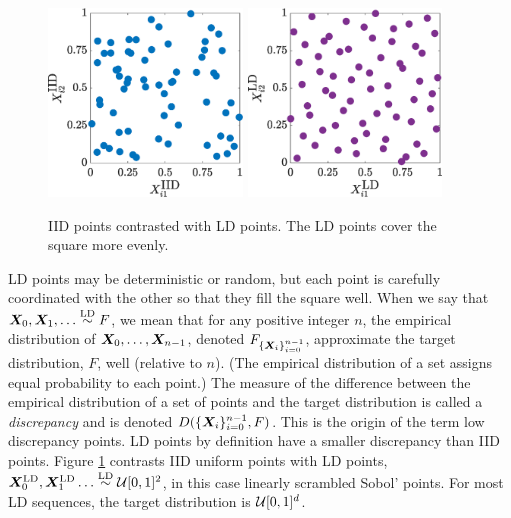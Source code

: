 \documentclass[graybox,footinfo]{svmult}
\newcommand{\LD}{\textup{LD}}
\newcommand{\LDsim}{\overset{\LD}{\sim}}
\begin{document}
\begin{figure}
	\includegraphics[height=5cm]{ProgramsImages/IIDPoints.eps} \qquad
	\includegraphics[height=5cm]{ProgramsImages/SSobolPoints.eps}
	\caption{IID points contrasted with LD points.  The LD points cover the square more evenly.} \label{fig:comparePts}
\end{figure}

LD points may be deterministic or random, but each point is carefully coordinated with the other so that they fill the square well.  When we say that $\bsX_0, \bsX_1, \ldots \LDsim F$, we mean that for any positive integer $n$,  the empirical distribution of ${\boldsymbol{X}}_0, \ldots, {\boldsymbol{X}}_{n-1}$, denoted $F_{\{{\boldsymbol{X}}_i\}_{i=0}^{n-1}}$,  approximate the target distribution, $F$, well (relative to $n$).  (The empirical distribution of a set assigns equal probability to each point.)  The measure of the difference between the empirical distribution of a set of points and the target distribution is called a \emph{discrepancy} and is denoted $D(\{{\boldsymbol{X}}_i\}_{i=0}^{n-1}, F)$.  This is the origin of the term low discrepancy points.  LD points by definition have a smaller discrepancy than IID points.  Figure \ref{fig:comparePts} contrasts IID uniform points with LD points, $\bsX^{\LD}_0, \bsX^{\LD}_1 \ldots \LDsim \calU[0,1]^2$, in this case linearly scrambled Sobol' points. For most LD sequences, the target distribution is ${\mathcal{U}}[0,1]^d$.
\end{document}
